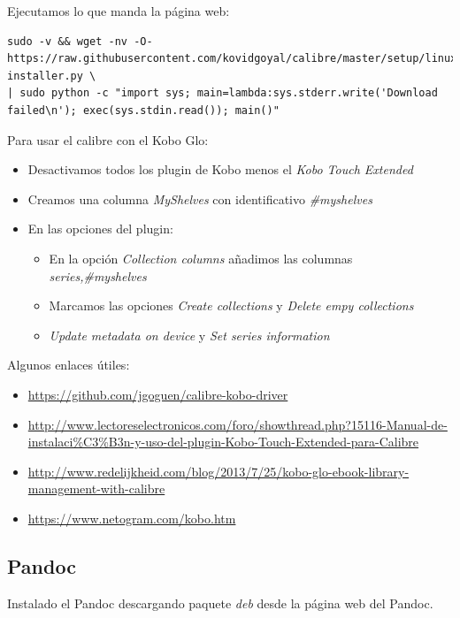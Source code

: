 \documentclass[12pt,spanish,]{article}
\providecommand{\tightlist}{%
  \setlength{\itemsep}{0pt}\setlength{\parskip}{0pt}}
\begin{document}
Ejecutamos lo que manda la página web:

\begin{verbatim}
sudo -v && wget -nv -O- https://raw.githubusercontent.com/kovidgoyal/calibre/master/setup/linux-installer.py \
| sudo python -c "import sys; main=lambda:sys.stderr.write('Download failed\n'); exec(sys.stdin.read()); main()"
\end{verbatim}

Para usar el calibre con el Kobo Glo:

\begin{itemize}
\item
  Desactivamos todos los plugin de Kobo menos el \emph{Kobo Touch
  Extended}
\item
  Creamos una columna \emph{MyShelves} con identificativo
  \emph{\#myshelves}
\item
  En las opciones del plugin:

  \begin{itemize}
  \tightlist
  \item
    En la opción \emph{Collection columns} añadimos las columnas
    \emph{series,\#myshelves}
  \item
    Marcamos las opciones \emph{Create collections} y \emph{Delete empy
    collections}
  \item
    \emph{Update metadata on device} y \emph{Set series information}
  \end{itemize}
\end{itemize}

Algunos enlaces útiles:

\begin{itemize}
\tightlist
\item
  \url{https://github.com/jgoguen/calibre-kobo-driver}
\item
  \url{http://www.lectoreselectronicos.com/foro/showthread.php?15116-Manual-de-instalaci\%C3\%B3n-y-uso-del-plugin-Kobo-Touch-Extended-para-Calibre}
\item
  \url{http://www.redelijkheid.com/blog/2013/7/25/kobo-glo-ebook-library-management-with-calibre}
\item
  \url{https://www.netogram.com/kobo.htm}
\end{itemize}

\subsection{Pandoc}\label{pandoc}

Instalado el Pandoc descargando paquete \emph{deb} desde la página web
del Pandoc.
\end{document}
